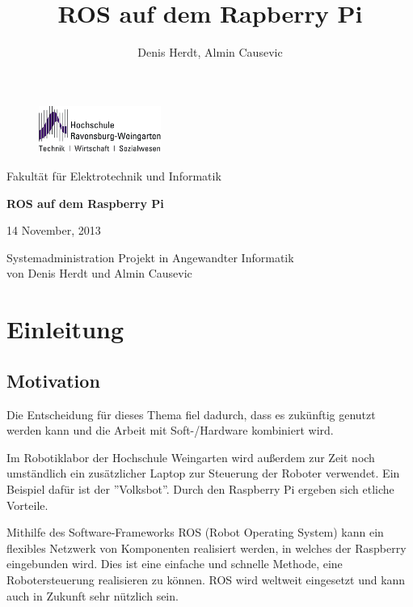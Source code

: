 \documentclass[12pt]{article}
\author{Denis Herdt, Almin Causevic}
\title{ROS auf dem Rapberry Pi}
\begin{document}
\begin{figure}[h]

\includegraphics[width=4cm]{hs-logo.jpg}
\end{figure}
Fakultät für Elektrotechnik und Informatik

\vspace{3cm}

\begin{center}

{\bf \huge ROS auf dem Raspberry Pi}
\vspace{4cm}

14 November, 2013
\vspace{1cm}

Systemadministration Projekt in Angewandter Informatik \\
von Denis Herdt und Almin Causevic

\end{center}

\pagebreak

\tableofcontents

\pagebreak

\section{Einleitung}

\subsection{Motivation}

Die Entscheidung für dieses Thema fiel dadurch, dass es zukünftig genutzt werden kann und die Arbeit mit Soft-/Hardware kombiniert wird.

Im Robotiklabor der Hochschule Weingarten wird außerdem zur Zeit noch umständlich ein zusätzlicher Laptop zur Steuerung der Roboter verwendet. Ein Beispiel dafür ist der ''Volksbot''. Durch den Raspberry Pi ergeben sich etliche Vorteile.

Mithilfe des Software-Frameworks ROS (Robot Operating System) kann ein flexibles Netzwerk von Komponenten realisiert werden, in welches der Raspberry eingebunden wird. Dies ist eine einfache und schnelle Methode, eine Robotersteuerung realisieren zu können. ROS wird weltweit eingesetzt und kann auch in Zukunft sehr nützlich sein.
\end{document}
